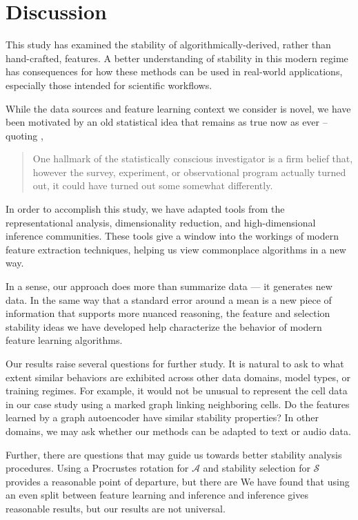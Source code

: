 
\section{Discussion}

This study has examined the stability of algorithmically-derived, rather than
hand-crafted, features. A better understanding of stability in this modern
regime has consequences for how these methods can be used in real-world
applications, especially those intended for scientific workflows.

While the data sources and feature learning context we consider is novel, we
have been motivated by an old statistical idea that remains as true now as ever
-- quoting \citep{mosteller1977data},

\begin{quote}
One hallmark of the statistically conscious investigator is a firm belief that,
however the survey, experiment, or observational program actually turned out, it
could have turned out some somewhat differently.
\end{quote}

In order to accomplish this study, we have adapted tools from the
representational analysis, dimensionality reduction, and high-dimensional
inference communities. These tools give a window into the workings of modern
feature extraction techniques, helping us view commonplace algorithms in a new
way.

In a sense, our approach does more than summarize data — it generates new data.
In the same way that a standard error around a mean is a new piece of
information that supports more nuanced reasoning, the feature and selection
stability ideas we have developed help characterize the behavior of modern
feature learning algorithms.

Our results raise several questions for further study. It is natural to ask
to what extent similar behaviors are exhibited across other data domains, model
types, or training regimes. For example, it would not be unusual to represent
the cell data in our case study using a marked graph linking neighboring cells.
Do the features learned by a graph autoencoder have similar stability
properties? In other domains, we may ask whether our methods can be adapted to
text or audio data.

Further, there are questions that may guide us towards better stability analysis
procedures. Using a Procrustes rotation for $\mathcal{A}$ and stability
selection for $\mathcal{S}$ provides a reasonable point of departure, but there are We have
found that using an even split between feature learning and inference and
inference gives reasonable results, but our results are not universal.

